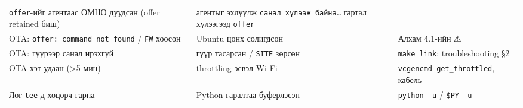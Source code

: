 \begin{longtable}[]{@{}lll@{}}
\begin{minipage}[t]{0.30\columnwidth}
\texttt{offer}-ийг агентаас ӨМНӨ дуудсан (offer retained биш)\strut
\end{minipage} & \begin{minipage}[t]{0.30\columnwidth}\raggedright
агентыг эхлүүлж \texttt{санал\ хүлээж\ байна\ldots{}} гартал хүлээгээд \texttt{offer}\strut
\end{minipage}\tabularnewline
\begin{minipage}[t]{0.30\columnwidth}\raggedright
OTA: \texttt{offer:\allowbreak{}\ command\ not\ found} / \texttt{FW} хоосон\strut
\end{minipage} & \begin{minipage}[t]{0.30\columnwidth}\raggedright
Ubuntu цонх солигдсон\strut
\end{minipage} & \begin{minipage}[t]{0.30\columnwidth}\raggedright
Алхам 4.1-ийн ⚠\strut
\end{minipage}\tabularnewline
\begin{minipage}[t]{0.30\columnwidth}\raggedright
OTA: гүүрээр санал ирэхгүй\strut
\end{minipage} & \begin{minipage}[t]{0.30\columnwidth}\raggedright
гүүр тасарсан / \texttt{SITE} зөрсөн\strut
\end{minipage} & \begin{minipage}[t]{0.30\columnwidth}\raggedright
\texttt{make\ link}; troubleshooting §2\strut
\end{minipage}\tabularnewline
\begin{minipage}[t]{0.30\columnwidth}\raggedright
OTA хэт удаан (\textgreater5 мин)\strut
\end{minipage} & \begin{minipage}[t]{0.30\columnwidth}\raggedright
throttling эсвэл Wi-Fi\strut
\end{minipage} & \begin{minipage}[t]{0.30\columnwidth}\raggedright
\texttt{vcgencmd\ get\_\allowbreak{}throttled}, кабель\strut
\end{minipage}\tabularnewline
\begin{minipage}[t]{0.30\columnwidth}\raggedright
Лог \texttt{tee}-д хоцорч гарна\strut
\end{minipage} & \begin{minipage}[t]{0.30\columnwidth}\raggedright
Python гаралтаа буферлэсэн\strut
\end{minipage} & \begin{minipage}[t]{0.30\columnwidth}\raggedright
\texttt{python\ -u} / \texttt{\$PY\ -u}\strut

\end{minipage}
\end{longtable}
